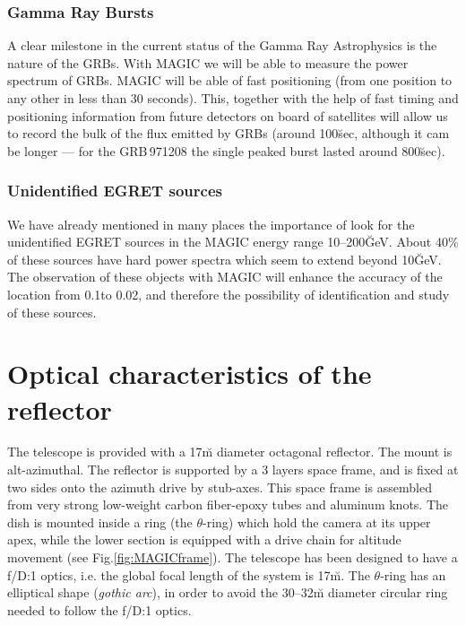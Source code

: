 \subsubsection*{Gamma Ray Bursts} 
%
A clear milestone in the current status of the Gamma Ray Astrophysics
is the nature of the GRBs. With MAGIC we will be able to measure the
power spectrum of GRBs. MAGIC will be able of fast positioning (from
one position to any other in less than 30 seconds). This, together
with the help of fast timing and positioning information from future
detectors on board of satellites will allow us to record the bulk of
the flux emitted by GRBs (around 100\u{sec}, although it cam be longer
--- for the GRB\,971208 the single peaked burst lasted around
800\u{sec}).

\subsubsection*{Unidentified EGRET sources} 
%
We have already mentioned in many places the importance of look for
the unidentified EGRET sources in the MAGIC energy range
10--200\u{GeV}. About 40\% of these sources have hard power spectra
which seem to extend beyond 10\u{GeV}. The observation of these
objects with MAGIC will enhance the accuracy of the location from
0.1\deg to 0.02\deg, and therefore the possibility of identification
and study of these sources.

\MAGICframefig

\section{Optical characteristics of the reflector}
%
The \MAGIC telescope is provided with a 17\u{m} diameter octagonal
reflector. The mount is alt-azimuthal. The reflector is supported by a
3 layers space frame, and is fixed at two sides onto the azimuth drive
by stub-axes. This space frame is assembled from very strong
low-weight carbon fiber-epoxy tubes and aluminum knots. The dish is
mounted inside a ring (the $\theta$-ring) which hold the camera at its
upper apex, while the lower section is equipped with a drive chain for
altitude movement (see Fig.\ref{fig:MAGICframe}). The telescope has
been designed to have a f/D:1 optics, i.e. the global focal length of
the system is 17\u{m}. The $\theta$-ring has an elliptical shape
(\emph{gothic arc}), in order to avoid the 30--32\u{m} diameter
circular ring needed to follow the f/D:1 optics.

